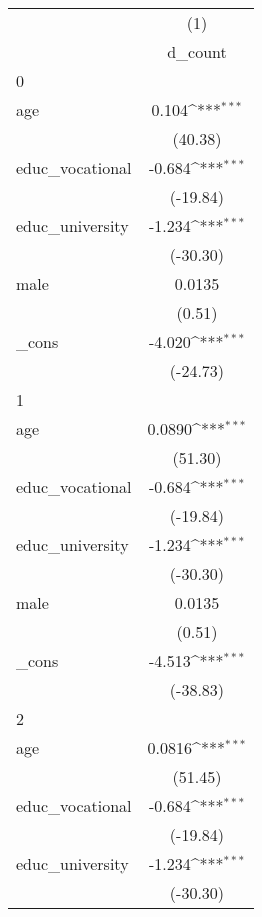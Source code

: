 {
\def\sym#1{\ifmmode^{#1}\else\(^{#1}\)\fi}
\begin{tabular}{l*{1}{c}}
\hline\hline
            &\multicolumn{1}{c}{(1)}\\
            &\multicolumn{1}{c}{d\_count}\\
\hline
0           &                     \\
age         &       0.104\sym{***}\\
            &     (40.38)         \\
[1em]
educ\_vocational&      -0.684\sym{***}\\
            &    (-19.84)         \\
[1em]
educ\_university&      -1.234\sym{***}\\
            &    (-30.30)         \\
[1em]
male        &      0.0135         \\
            &      (0.51)         \\
[1em]
\_cons      &      -4.020\sym{***}\\
            &    (-24.73)         \\
\hline
1           &                     \\
age         &      0.0890\sym{***}\\
            &     (51.30)         \\
[1em]
educ\_vocational&      -0.684\sym{***}\\
            &    (-19.84)         \\
[1em]
educ\_university&      -1.234\sym{***}\\
            &    (-30.30)         \\
[1em]
male        &      0.0135         \\
            &      (0.51)         \\
[1em]
\_cons      &      -4.513\sym{***}\\
            &    (-38.83)         \\
\hline
2           &                     \\
age         &      0.0816\sym{***}\\
            &     (51.45)         \\
[1em]
educ\_vocational&      -0.684\sym{***}\\
            &    (-19.84)         \\
[1em]
educ\_university&      -1.234\sym{***}\\
            &    (-30.30)         \\

\end{tabular}}
